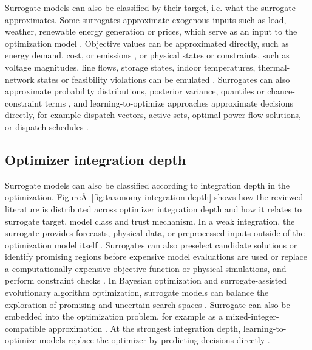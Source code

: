 Surrogate models can also be classified by their target, i.e. what the
surrogate approximates. Some surrogates approximate exogenous inputs
such as load, weather, renewable energy generation or prices, which
serve as an input to the optimization model
\cite{Eseye201991463,Li2020,Hanifi2024,Conti2026}. Objective values
can be approximated directly, such as energy demand, cost, or emissions
\cite{Westermann2019,Hirvonen2017323,Ahmad202451}, or
physical states or constraints, such as voltage magnitudes, line flows,
storage states, indoor temperatures, thermal-network states or
feasibility violations can be emulated
\cite{Park2019,Su2022315,Mohammadi2024,Khaloie2025}. Surrogates can
also approximate probability distributions, posterior variance,
quantiles or chance-constraint terms
\cite{Muhlpfordt20194806,Hu2020,Volodina2022,Tan2026}, and
learning-to-optimize approaches approximate decisions directly, for
example dispatch vectors, active sets, optimal power flow solutions, or
dispatch schedules
\cite{Wu2022231,Chen2022,Chen20244723,Xu20223066,Li202359995,Liang20246508}.

\subsection{Optimizer integration depth}
\label{sec:tax:integration-depth}

Surrogate models can also be classified according to integration depth
in the optimization.
FigureÂ~\ref{fig:taxonomy-integration-depth} shows how the reviewed
literature is distributed across optimizer integration depth and how it
relates to surrogate target, model class and trust mechanism. In a weak
integration, the surrogate provides forecasts, physical data, or
preprocessed inputs outside of the optimization model itself
\cite{Eseye201991463,Li2020,Hanifi2024}. Surrogates can also preselect
candidate solutions or identify promising regions before expensive model
evaluations are used \cite{Han2018622,Schulte2020,Pang2023,Xiao2018}
or replace a computationally expensive objective function or physical
simulations, and perform constraint checks
\cite{Hirvonen2017323,Deng2020831,Thrampoulidis2021}. In
Bayesian optimization and surrogate-assisted evolutionary algorithm
optimization, surrogate models can balance the exploration of promising
and uncertain search spaces
\cite{DiazManriquez2016,Hu2020,Schulte2020,Volodina2022}. Surrogate
can also be embedded into the optimization problem, for example as a
mixed-integer-compatible approximation
\cite{Wu2022231,Chen2022,Lin2023,Pang2023}. At the strongest
integration depth, learning-to-optimize models replace the optimizer by
predicting decisions directly
\cite{Wu2022231,Chen20244723,Li202359995,Liang20246508}.


